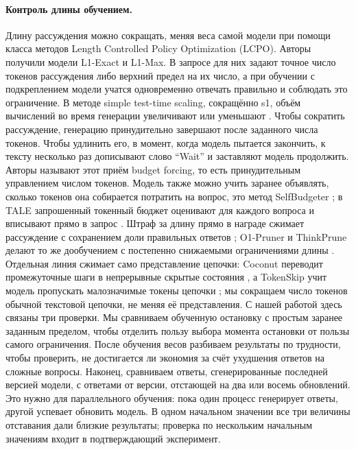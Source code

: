 \documentclass[11pt]{article}
\begin{document}
\paragraph{Контроль длины обучением.} Длину рассуждения можно сокращать, меняя веса самой модели при помощи класса методов Length Controlled Policy Optimization (LCPO). Авторы \citet{aggarwal2025l1} получили модели L1-Exact и L1-Max. В запросе для них задают точное число токенов рассуждения либо верхний предел на их число, а при обучении с подкреплением модели учатся одновременно отвечать правильно и соблюдать это ограничение. В методе simple test-time scaling, сокращённо s1, объём вычислений во время генерации увеличивают или уменьшают \citep{muennighoff2025s1}. Чтобы сократить рассуждение, генерацию принудительно завершают после заданного числа токенов. Чтобы удлинить его, в момент, когда модель пытается закончить, к тексту несколько раз дописывают слово ``Wait'' и заставляют модель продолжить. Авторы называют этот приём budget forcing, то есть принудительным управлением числом токенов. Модель также можно учить заранее объявлять, сколько токенов она собирается потратить на вопрос, это метод SelfBudgeter \citep{li2025selfbudgeter}; в TALE запрошенный токенный бюджет оценивают для каждого вопроса и вписывают прямо в запрос \citep{han2024tale}. Штраф за длину прямо в награде сжимает рассуждение с сохранением доли правильных ответов \citep{arora2025efficient,yang2025thinkingoptimal,xiang2025alp,lyu2025hbpo}; O1-Pruner и ThinkPrune делают то же дообучением с постепенно снижаемыми ограничениями длины \citep{luo2025o1pruner,hou2025thinkprune}. Отдельная линия сжимает само представление цепочки: Coconut переводит промежуточные шаги в непрерывные скрытые состояния \citep{hao2024coconut}, а TokenSkip учит модель пропускать малозначимые токены цепочки \citep{xia2025tokenskip}; мы сокращаем число токенов обычной текстовой цепочки, не меняя её представления. С нашей работой здесь связаны три проверки. Мы сравниваем обученную остановку с простым заранее заданным пределом, чтобы отделить пользу выбора момента остановки от пользы самого ограничения. После обучения весов разбиваем результаты по трудности, чтобы проверить, не достигается ли экономия за счёт ухудшения ответов на сложные вопросы. Наконец, сравниваем ответы, сгенерированные последней версией модели, с ответами от версии, отстающей на два или восемь обновлений. Это нужно для параллельного обучения: пока один процесс генерирует ответы, другой успевает обновить модель. В одном начальном значении все три величины отставания дали близкие результаты; проверка по нескольким начальным значениям входит в подтверждающий эксперимент.
\end{document}
